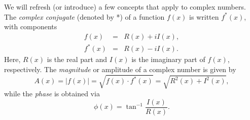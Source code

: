 We will refresh (or introduce) a few concepts that apply to complex numbers.
The \emph{complex conjugate} (denoted by *) of a function $f(x)$ is written $f^*(x)$, with components
\begin{equation}
\begin{array}{lcr}
f(x) & = & R (x) + i I(x), \\[14pt]
f^{\ast}(x) & = & R (x) - i I(x).
\end{array}
\end{equation}
Here, $R(x)$ is the real part and $I(x)$ is the imaginary part of $f(x)$, respectively. The \emph{magnitude} or
amplitude of a complex number is given by
\begin{equation}
A(x) = | f(x) | = \sqrt{f(x) \cdot f^*(x)} = \sqrt{R^2 (x) + I^2 (x)},
\end{equation}
while the \emph{phase} is obtained via
\begin{equation}
\phi(x) = \tan^{-1} \frac{I(x)}{R(x)}.
\end{equation}

